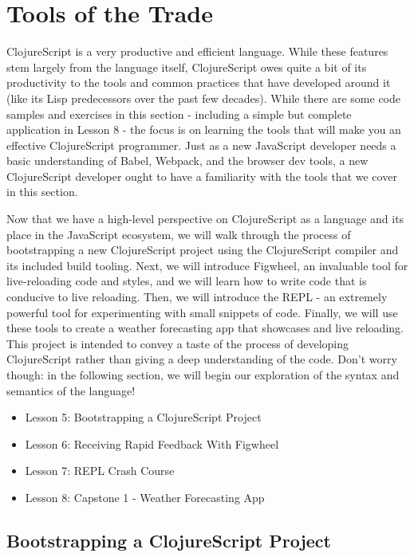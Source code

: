 \documentclass[10pt,twoside,openright]{memoir}
\begin{document}
\cleardoublepage

{\let\newpage\relax\part{Tools of the Trade}}

ClojureScript is a very productive and efficient language. While these
features stem largely from the language itself, ClojureScript owes quite
a bit of its productivity to the tools and common practices that have
developed around it (like its Lisp predecessors over the past few
decades). While there are some code samples and exercises in this
section - including a simple but complete application in
Lesson 8 -
the focus is on learning the tools that will make you an effective
ClojureScript programmer. Just as a new JavaScript developer needs a
basic understanding of Babel, Webpack, and the browser dev tools, a new
ClojureScript developer ought to have a familiarity with the tools that
we cover in this section.

Now that we have a high-level perspective on ClojureScript as a language
and its place in the JavaScript ecosystem, we will walk through the
process of bootstrapping a new ClojureScript project using the
ClojureScript compiler and its included build tooling. Next, we will
introduce Figwheel, an invaluable tool for live-reloading code and
styles, and we will learn how to write code that is conducive to live
reloading. Then, we will introduce the REPL - an extremely powerful tool
for experimenting with small snippets of code. Finally, we will use
these tools to create a weather forecasting app that showcases and live
reloading. This project is intended to convey a taste of the process of
developing ClojureScript rather than giving a deep understanding of the
code. Don't worry though: in the following section, we will begin our
exploration of the syntax and semantics of the language!

\begin{itemize}
\tightlist
\item Lesson 5: Bootstrapping a ClojureScript Project
\item Lesson 6: Receiving Rapid Feedback With Figwheel
\item Lesson 7: REPL Crash Course
\item Lesson 8: Capstone 1 - Weather Forecasting App
\end{itemize}


\chapter{Bootstrapping a ClojureScript Project}
\end{document}
